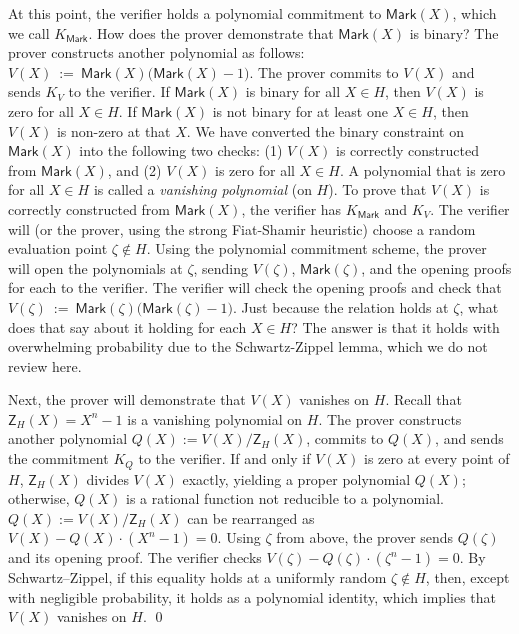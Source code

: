 At this point, the verifier holds a polynomial commitment to $\mathsf{Mark}(X)$, which we call $K_{\mathsf{Mark}}$. 
How does the prover demonstrate that $\mathsf{Mark}(X)$ is binary? 
The prover constructs another polynomial as follows: $V(X)\ :=\ \mathsf{Mark}(X)\bigl(\mathsf{Mark}(X)-1\bigr)$. 
The prover commits to $V(X)$ and sends $K_{V}$ to the verifier. 
If $\mathsf{Mark}(X)$ is binary for all $X\in H$, then $V(X)$ is zero for all $X\in H$. 
If $\mathsf{Mark}(X)$ is not binary for at least one $X\in H$, then $V(X)$ is non-zero at that $X$. 
We have converted the binary constraint on $\mathsf{Mark}(X)$ into the following two checks: (1) $V(X)$ is correctly constructed from $\mathsf{Mark}(X)$, and (2) $V(X)$ is zero for all $X\in H$. 
A polynomial that is zero for all $X\in H$ is called a \textit{vanishing polynomial} (on $H$).
%
To prove that $V(X)$ is correctly constructed from $\mathsf{Mark}(X)$, the verifier has $K_{\mathsf{Mark}}$ and $K_{V}$. 
The verifier will (or the prover, using the strong Fiat-Shamir heuristic) choose a random evaluation point $\zeta \notin H$. 
Using the polynomial commitment scheme, the prover will open the polynomials at $\zeta$, sending $V(\zeta)$, $\mathsf{Mark}(\zeta)$, and the opening proofs for each to the verifier. 
The verifier will check the opening proofs and check that $V(\zeta)\ :=\ \mathsf{Mark}(\zeta)\bigl(\mathsf{Mark}(\zeta)-1\bigr)$. 
Just because the relation holds at $\zeta$, what does that say about it holding for each $X\in H$? 
The answer is that it holds with overwhelming probability due to the Schwartz-Zippel lemma, which we do not review here.

Next, the prover will demonstrate that $V(X)$ vanishes on $H$. 
Recall that $\mathsf{Z}_H(X)=X^n-1$ is a vanishing polynomial on $H$. 
The prover constructs another polynomial $Q(X):=V(X)/\mathsf{Z}_H(X)$, commits to $Q(X)$, and sends the commitment $K_{Q}$ to the verifier. 
If and only if $V(X)$ is zero at every point of $H$, $\mathsf{Z}_H(X)$ divides $V(X)$ exactly, yielding a proper polynomial $Q(X)$; otherwise, $Q(X)$ is a rational function not reducible to a polynomial. 
$Q(X):=V(X)/\mathsf{Z}_H(X)$ can be rearranged as $V(X)-Q(X)\cdot(X^n-1)=0$. 
Using $\zeta$ from above, the prover sends $Q(\zeta)$ and its opening proof. 
The verifier checks $V(\zeta)-Q(\zeta)\cdot(\zeta^n-1)=0$. 
By Schwartz–Zippel, if this equality holds at a uniformly random $\zeta\notin H$, then, except with negligible probability, it holds as a polynomial identity, which implies that $V(X)$ vanishes on $H$. \qed

